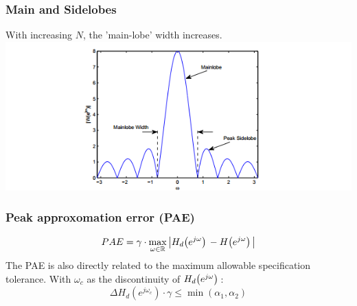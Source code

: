 \documentclass[accentcolor=tud4c,9.5pt,nochapname,bigchapter,paper=a5report]{tudreport}
\begin{document}
\subsubsection{Main and Sidelobes}
With increasing $N$, the 'main-lobe' width increases. \\
\includegraphics[width=\textwidth]{images/main_side_lobes.png}

\subsubsection{Peak approxomation error (PAE)}
\begin{equation}
 PAE =\gamma \cdot \max\limits_{\omega \in \mathbb{R}} \left|H_d{\left(e^{j\omega}\right)}\, - H{\left(e^{j\omega}\right)}\,\right|
\end{equation}
The PAE is also directly related to the maximum allowable specification tolerance.
With $\omega_c$ as the discontinuity of $H_d{\left(e^{j\omega}\right)}\,$: 
\begin{equation}
\Delta H_d\left(e^{j\omega_c}\right) \cdot \gamma \leq \min(\alpha_1,\alpha_2)
\end{equation}
\end{document}
